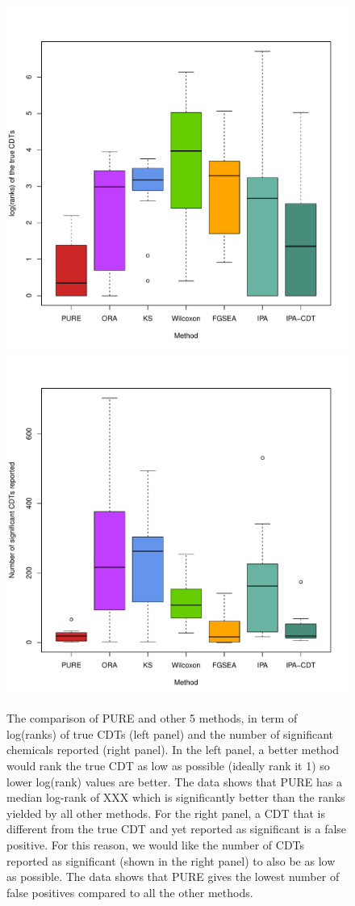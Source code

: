 \documentclass[Minh_PhD_thesis.tex]{subfiles}
\begin{document}
\begin{figure}
\begin{center}
\includegraphics[width=0.49\linewidth]{../Figures/RankTarget_vOrg_log.pdf}
\includegraphics[width=0.49\linewidth]{../Figures/NrSigChem_vOrg.pdf}

\caption{The comparison of PURE and other 5 methods, in term of log(ranks) of true CDTs (left panel) and the number of significant chemicals reported (right panel). In the left panel, a better method would rank the true CDT as low as possible (ideally rank it 1) so lower log(rank) values are better. The data shows that PURE has a median log-rank of XXX which is significantly better than the ranks yielded by all other methods. For the right panel, a CDT that is different from the true CDT and yet reported as significant is a false positive. For this reason, we would like the number of CDTs reported as significant (shown in the right panel) to also be as low as possible. The data shows that PURE gives the lowest number  of false positives compared to all the other methods.}
\label{fig:resultFigure}
\end{center}
\end{figure}
\end{document}
